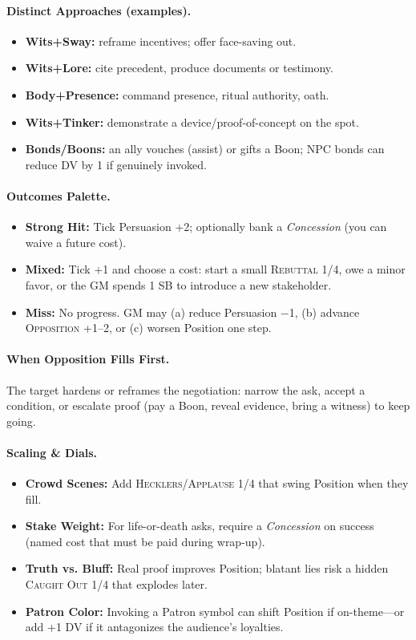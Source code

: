 \paragraph{Distinct Approaches (examples).}
\begin{itemize}
  \item \textbf{Wits+Sway:} reframe incentives; offer face-saving out.
  \item \textbf{Wits+Lore:} cite precedent, produce documents or testimony.
  \item \textbf{Body+Presence:} command presence, ritual authority, oath.
  \item \textbf{Wits+Tinker:} demonstrate a device/proof-of-concept on the spot.
  \item \textbf{Bonds/Boons:} an ally vouches (assist) or gifts a Boon; NPC bonds can reduce DV by 1 if genuinely invoked.
\end{itemize}

\paragraph{Outcomes Palette.}
\begin{itemize}
  \item \textbf{Strong Hit:} Tick Persuasion +2; optionally bank a \emph{Concession} (you can waive a future cost).
  \item \textbf{Mixed:} Tick +1 and choose a cost: start a small \textsc{Rebuttal 1/4}, owe a minor favor, or the GM spends 1 SB to introduce a new stakeholder.
  \item \textbf{Miss:} No progress. GM may (a) reduce Persuasion −1, (b) advance \textsc{Opposition} +1–2, or (c) worsen Position one step.
\end{itemize}

\paragraph{When Opposition Fills First.}
The target hardens or reframes the negotiation: narrow the ask, accept a condition, or escalate proof (pay a Boon, reveal evidence, bring a witness) to keep going.

\paragraph{Scaling & Dials.}
\begin{itemize}
  \item \textbf{Crowd Scenes:} Add \textsc{Hecklers}/\textsc{Applause} 1/4 that swing Position when they fill.
  \item \textbf{Stake Weight:} For life-or-death asks, require a \emph{Concession} on success (named cost that must be paid during wrap-up).
  \item \textbf{Truth vs. Bluff:} Real proof improves Position; blatant lies risk a hidden \textsc{Caught Out} 1/4 that explodes later.
  \item \textbf{Patron Color:} Invoking a Patron symbol can shift Position if on-theme—or add +1 DV if it antagonizes the audience’s loyalties.
\end{itemize}

